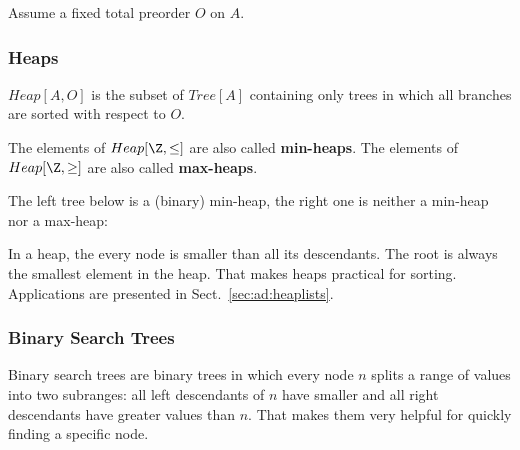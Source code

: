 Assume a fixed total preorder $O$ on $A$.

\subsubsection{Heaps}\label{sec:ad:heaps}

\begin{definition}[Heap]
$Heap[A,O]$ is the subset of $Tree[A]$ containing only trees in which all branches are sorted with respect to $O$.
\end{definition}

The elements of $Heap[\Z,\leq]$ are also called \textbf{min-heaps}.
The elements of $Heap[\Z,\geq]$ are also called \textbf{max-heaps}.

The left tree below is a (binary) min-heap, the right one is neither a min-heap nor a max-heap:

\begin{center}
\tb\tb
{}
\end{center}

In a heap, the every node is smaller than all its descendants.
The root is always the smallest element in the heap.
That makes heaps practical for sorting.
Applications are presented in Sect.~\ref{sec:ad:heaplists}.

\subsubsection{Binary Search Trees}

Binary search trees are binary trees in which every node $n$ splits a range of values into two subranges: all left descendants of $n$ have smaller and all right descendants have greater values than $n$.
That makes them very helpful for quickly finding a specific node.

